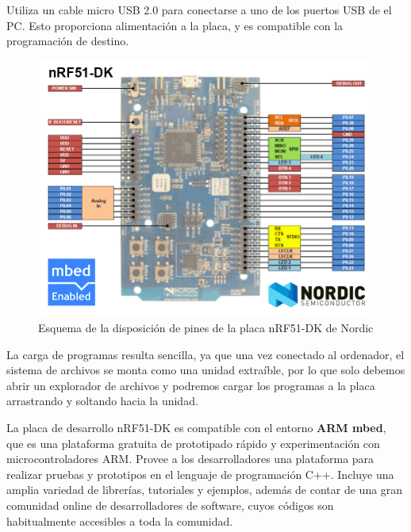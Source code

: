 Utiliza un cable micro USB 2.0 para conectarse a uno de los puertos USB de el PC. Esto proporciona alimentación a la placa, y es compatible con la programación de destino.

\begin{figure}[h]%
	\centering
    \includegraphics[scale=0.5]{figures/nRF51DK_pines.png} %

    \caption[Esquema de la disposición de pines de la placa nRF51-DK de Nordic]{Esquema de la disposición de pines de la placa nRF51-DK de Nordic}

   \label{figuraNordicNRF51}
\end{figure}

La carga de programas resulta sencilla, ya que una vez conectado al ordenador, el sistema de archivos se monta como una unidad extraíble, por lo que solo debemos abrir un explorador de archivos y podremos cargar los programas a la placa arrastrando y soltando hacia la unidad.

La placa de desarrollo nRF51-DK es compatible con el entorno \textbf{ARM mbed}, que es una plataforma gratuita de prototipado rápido y experimentación con microcontroladores ARM. Provee a los desarrolladores una plataforma para realizar pruebas y prototipos en el lenguaje de programación C++. Incluye una amplia variedad de librerías, tutoriales y ejemplos, además de contar de una gran comunidad online de desarrolladores de software, cuyos códigos son habitualmente accesibles a toda la comunidad.

